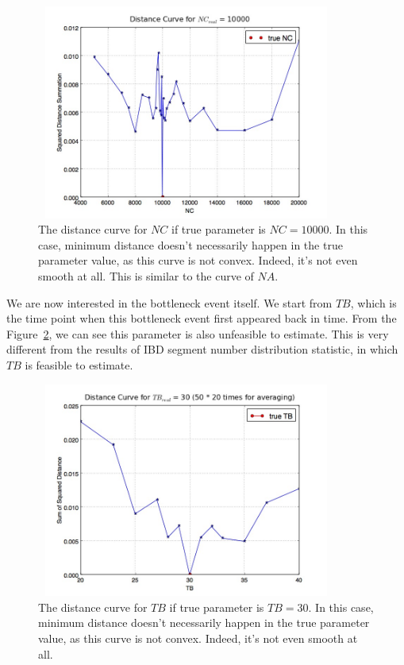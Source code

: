 \documentclass{bioinfo}
\begin{document}
\begin{figure}[h]
\centerline{\includegraphics[width=280pt, height=200pt]{like_NC.jpg}}
\caption{The distance curve for $NC$ if true parameter is $NC=10000$. In this case, minimum distance doesn't necessarily happen in the true parameter value, as this curve is not convex. Indeed, it's not even smooth at all. This is similar to the curve of $NA$.}\label{fig:dis_NC}
\end{figure}

We are now interested in the bottleneck event itself. We start from $TB$, which is the time point when this bottleneck event first appeared back in time. From the Figure~\ref{fig:dis_TB}, we can see this parameter is also unfeasible to estimate. This is very different from the results of IBD segment number distribution statistic, in which $TB$ is feasible to estimate.

\begin{figure}[h]
\centerline{\includegraphics[width=280pt, height=200pt]{like_TB.jpg}}
\caption{The distance curve for $TB$ if true parameter is $TB=30$. In this case, minimum distance doesn't necessarily happen in the true parameter value, as this curve is not convex. Indeed, it's not even smooth at all.}\label{fig:dis_TB}
\end{figure}
\end{document}
